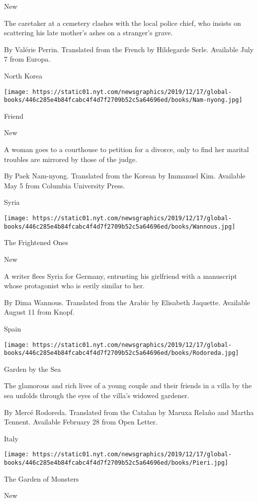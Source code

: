New

The caretaker at a cemetery clashes with the local police chief, who
insists on scattering his late mother's ashes on a stranger's grave.

 By Valérie Perrin. Translated from the French by Hildegarde Serle.
Available July 7 from Europa.

North Korea

\texttt{[image: https://static01.nyt.com/newsgraphics/2019/12/17/global-books/446c285e4b84fcabc4f4d7f2709b52c5a64696ed/books/Nam-nyong.jpg]}

Friend

New

A woman goes to a courthouse to petition for a divorce, only to find her
marital troubles are mirrored by those of the judge.

 By Paek Nam-nyong. Translated from the Korean by Immanuel Kim.
Available May 5 from Columbia University Press.

Syria

\texttt{[image: https://static01.nyt.com/newsgraphics/2019/12/17/global-books/446c285e4b84fcabc4f4d7f2709b52c5a64696ed/books/Wannous.jpg]}

The Frightened Ones

New

A writer flees Syria for Germany, entrusting his girlfriend with a
manuscript whose protagonist who is eerily similar to her.

 By Dima Wannous. Translated from the Arabic by Elisabeth Jaquette.
Available August 11 from Knopf.

Spain

\texttt{[image: https://static01.nyt.com/newsgraphics/2019/12/17/global-books/446c285e4b84fcabc4f4d7f2709b52c5a64696ed/books/Rodoreda.jpg]}

Garden by the Sea

The glamorous and rich lives of a young couple and their friends in a
villa by the sea unfolds through the eyes of the villa's widowed
gardener.

 By Mercé Rodoreda. Translated from the Catalan by Maruxa Relaño and
Martha Tennent. Available February 28 from Open Letter.

Italy

\texttt{[image: https://static01.nyt.com/newsgraphics/2019/12/17/global-books/446c285e4b84fcabc4f4d7f2709b52c5a64696ed/books/Pieri.jpg]}

The Garden of Monsters

New

